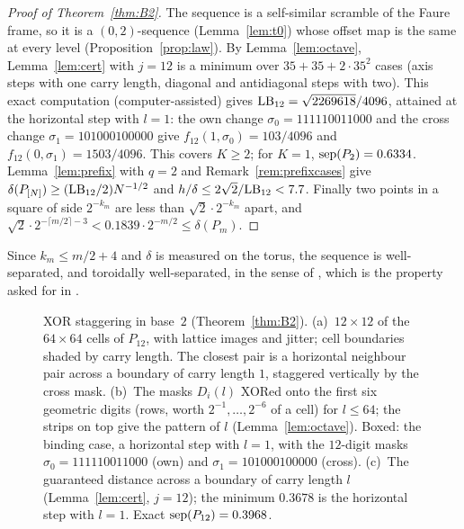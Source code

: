 \begin{proof}[Proof of Theorem~\ref{thm:B2}]
The sequence is a self-similar scramble of the Faure frame, so it is a $(0,2)$-sequence (Lemma~\ref{lem:t0}) whose offset map is the same at every level (Proposition~\ref{prop:law}). By Lemma~\ref{lem:octave}, Lemma~\ref{lem:cert} with $j=12$ is a minimum over $35+35+2\cdot35^2$ cases (axis steps with one carry length, diagonal and antidiagonal steps with two). This exact computation (computer-assisted) gives $\mathrm{LB}_{12}=\sqrt{2269618}/4096$, attained at the horizontal step with $l=1$: the own change $\sigma_0=111110011000$ and the cross change $\sigma_1=101000100000$ give $f_{12}(1,\sigma_0)=103/4096$ and $f_{12}(0,\sigma_1)=1503/4096$. This covers $K\ge2$; for $K=1$, $\operatorname{sep}(P_2)=0.6334$. Lemma~\ref{lem:prefix} with $q=2$ and Remark~\ref{rem:prefixcases} give $\delta(P_{[N]})\ge(\mathrm{LB}_{12}/2)N^{-1/2}$ and $h/\delta\le2\sqrt2/\mathrm{LB}_{12}<7.7$. Finally two points in a square of side $2^{-k_m}$ are less than $\sqrt2\cdot2^{-k_m}$ apart, and $\sqrt2\cdot2^{-\lceil m/2\rceil-3}<0.1839\cdot2^{-m/2}\le\delta(P_m)$.
\end{proof}

Since $k_m\le m/2+4$ and $\delta$ is measured on the torus, the sequence is well-separated, and toroidally well-separated, in the sense of \cite[Def.~3.8]{DGS2}, which is the property asked for in \cite[Section~4.2]{DGS2}.

\begin{figure}[t]
\centering
{}
\caption{XOR staggering in base~$2$ (Theorem~\ref{thm:B2}). (a)~$12\times12$ of the $64\times64$ cells of $P_{12}$, with lattice images and jitter; cell boundaries shaded by carry length. The closest pair is a horizontal neighbour pair across a boundary of carry length $1$, staggered vertically by the cross mask. (b)~The masks $D_i(l)$ XORed onto the first six geometric digits (rows, worth $2^{-1},\dots,2^{-6}$ of a cell) for $l\le64$; the strips on top give the pattern of $l$ (Lemma~\ref{lem:octave}). Boxed: the binding case, a horizontal step with $l=1$, with the $12$-digit masks $\sigma_0=111110011000$ (own) and $\sigma_1=101000100000$ (cross). (c)~The guaranteed distance across a boundary of carry length $l$ (Lemma~\ref{lem:cert}, $j=12$); the minimum $0.3678$ is the horizontal step with $l=1$. Exact $\operatorname{sep}(P_{12})=0.3968$.}
\label{fig:B2}
\end{figure}

